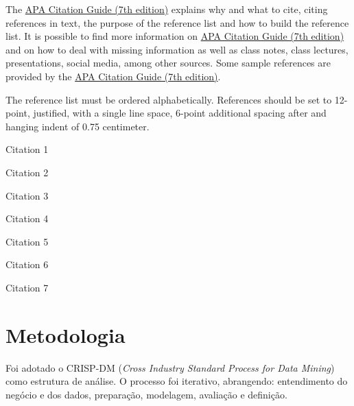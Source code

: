 \documentclass[english, spanish, brazilian]{RBIEarticle} %
\begin{document}
    The  \href{https://libguides.brenau.edu/APA7}{APA Citation Guide (7th edition)} explains why and what to cite, citing references in text, the purpose of the reference list and how to build the reference list. It is possible to find more information on  \href{https://libguides.brenau.edu/APA7}{APA Citation Guide (7th edition)} and on how to deal with missing information as well as class notes, class lectures, presentations, social media, among other sources. Some sample references are provided by the  \href{https://libguides.brenau.edu/APA7}{APA Citation Guide (7th edition)}.
    
    The reference list must be ordered alphabetically. References should be set to 12-point, justified, with a single line space, 6-point additional spacing after and hanging indent of 0.75 centimeter.
    
    Citation 1 \parencite{Baker2011}
    
    Citation 2 \parencite{Seffrin2013}
    
    Citation 3 \parencite{Brasil2008}
    
    Citation 4 \parencite{Kautzman2015}
    
    Citation 5 \parencite{Sweller1991}
    
    Citation 6 \parencite{Clark2006}
    
    Citation 7 \parencite{Mason2012}
\fi %


\section{Metodologia}
Foi adotado o CRISP-DM (\textit{Cross Industry Standard Process for Data Mining}) como estrutura de análise. O processo foi iterativo, abrangendo: entendimento do negócio e dos dados, preparação, modelagem, avaliação e definição.
\end{document}
